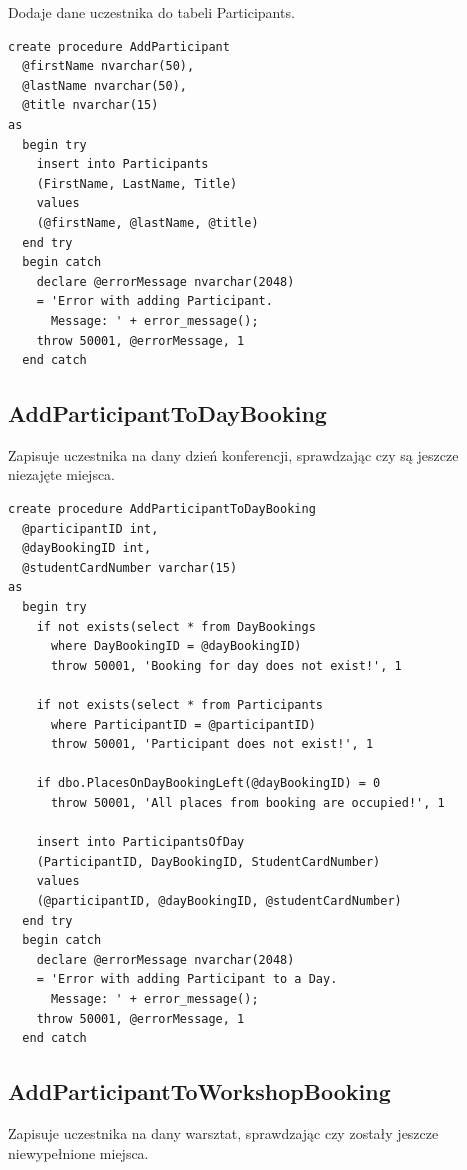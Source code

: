 \documentclass[12pt, a4paper]{mwrep}
\begin{document}
\noindent Dodaje dane uczestnika do tabeli Participants.

\begin{lstlisting}
create procedure AddParticipant
  @firstName nvarchar(50),
  @lastName nvarchar(50),
  @title nvarchar(15)
as
  begin try
    insert into Participants
    (FirstName, LastName, Title)
    values
    (@firstName, @lastName, @title)
  end try
  begin catch
    declare @errorMessage nvarchar(2048)
    = 'Error with adding Participant. 
      Message: ' + error_message();
    throw 50001, @errorMessage, 1
  end catch
\end{lstlisting}

\subsection{AddParticipantToDayBooking}

\noindent Zapisuje uczestnika na dany dzień konferencji, sprawdzając czy są jeszcze niezajęte miejsca.

\begin{lstlisting}
create procedure AddParticipantToDayBooking
  @participantID int,
  @dayBookingID int,
  @studentCardNumber varchar(15)
as
  begin try
    if not exists(select * from DayBookings 
      where DayBookingID = @dayBookingID)
      throw 50001, 'Booking for day does not exist!', 1

    if not exists(select * from Participants 
      where ParticipantID = @participantID)
      throw 50001, 'Participant does not exist!', 1

    if dbo.PlacesOnDayBookingLeft(@dayBookingID) = 0
      throw 50001, 'All places from booking are occupied!', 1

    insert into ParticipantsOfDay
    (ParticipantID, DayBookingID, StudentCardNumber)
    values
    (@participantID, @dayBookingID, @studentCardNumber)
  end try
  begin catch
    declare @errorMessage nvarchar(2048)
    = 'Error with adding Participant to a Day. 
      Message: ' + error_message();
    throw 50001, @errorMessage, 1
  end catch
\end{lstlisting}

\subsection{AddParticipantToWorkshopBooking}

\noindent Zapisuje uczestnika na dany warsztat, sprawdzając czy zostały jeszcze niewypełnione miejsca.
\end{document}
